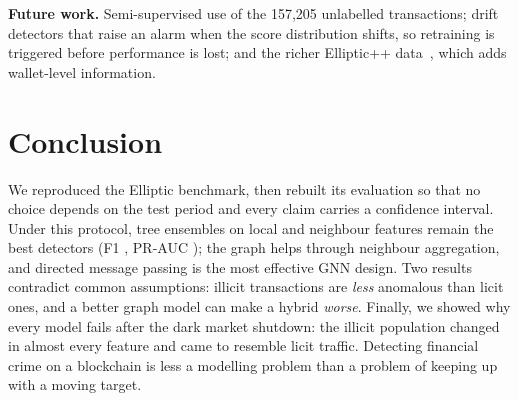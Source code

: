 \textbf{Future work.} Semi-supervised use of the 157,205 unlabelled
transactions; drift detectors that raise an alarm when the score distribution
shifts, so retraining is triggered before performance is lost; and the richer
Elliptic++ data~\cite{elmougy2023}, which adds wallet-level information.

\section{Conclusion}

We reproduced the Elliptic benchmark, then rebuilt its evaluation so that no
choice depends on the test period and every claim carries a confidence interval.
Under this protocol, tree ensembles on local and neighbour features remain the
best detectors (F1 \MainRFFone{}, PR-AUC \MainXGBPRAUC{}); the graph helps through
neighbour aggregation, and directed message passing is the most effective GNN
design. Two results contradict common assumptions: illicit transactions are
\emph{less} anomalous than licit ones, and a better graph model can make a hybrid
\emph{worse}. Finally, we showed why every model fails after the dark market
shutdown: the illicit population changed in almost every feature and came to
resemble licit traffic. Detecting financial crime on a blockchain is less a
modelling problem than a problem of keeping up with a moving target.
